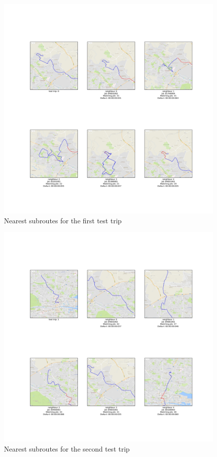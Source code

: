 \documentclass[12pt]{article}
\begin{document}
	\begin{figure} [H]
		\begin{center}
			\includegraphics [scale = 0.40] {subroutes1.jpg}
			\caption{Nearest subroutes for the first test trip}
		\end{center}
	\end{figure} 
	
	\begin{figure} [H]
		\begin{center}
			\includegraphics [scale = 0.40] {subroutes2.jpg}
			\caption{Nearest subroutes for the second test trip}
		\end{center}
	\end{figure}
	
\end{document}
